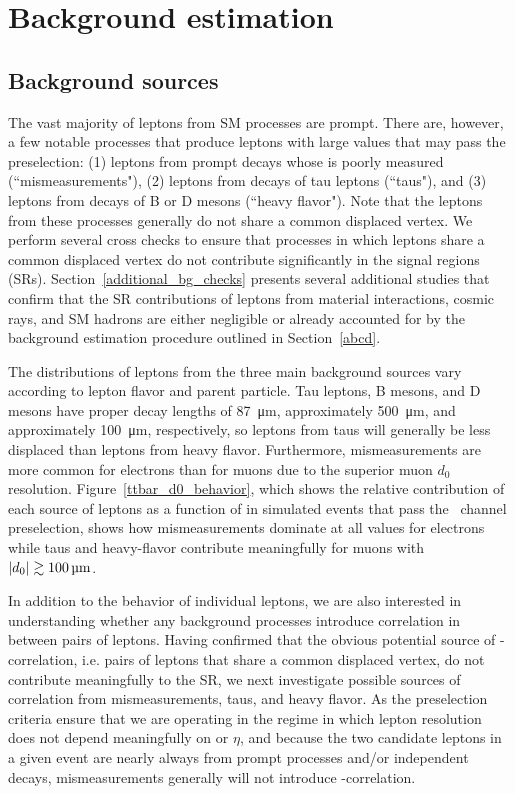 \section{Background estimation}
\label{bg}
\subsection{Background sources}
\label{bg_sources}
The vast majority of leptons from SM processes are prompt. There are, however, a few notable processes that produce leptons with large \ad values that may pass the preselection: (1) leptons from prompt decays whose \ad is poorly measured (``mismeasurements"), (2) leptons from  decays of tau leptons (``taus"), and (3) leptons from decays of B or D mesons (``heavy flavor"). Note that the leptons from these processes generally do not share a common displaced vertex. We perform several cross checks to ensure that processes in which leptons share a common displaced vertex do not contribute significantly in the signal regions (SRs). Section~\ref{additional_bg_checks} presents several additional studies that confirm that the SR contributions of leptons from material interactions, cosmic rays, and SM hadrons are either negligible or already accounted for by the background estimation procedure outlined in Section~\ref{abcd}.

The \ad distributions of leptons from the three main background sources vary according to lepton flavor and parent particle. Tau leptons, B mesons, and D mesons have proper decay lengths of \SI{87}{\um}, approximately \SI{500}{\um}, and approximately \linebreak[4]\SI{100}{\um}, respectively, so leptons from taus will generally be less displaced than leptons from heavy flavor. Furthermore, mismeasurements are more common for electrons than for muons due to the superior muon $d_0$ resolution. Figure~\ref{ttbar_d0_behavior}, which shows the relative contribution of each source of leptons as a function of \ad in simulated \ttbar events that pass the \Pe\Pgm\ channel preselection, shows how mismeasurements dominate at all \ad values for electrons while taus and heavy-flavor contribute meaningfully for muons with $\ad\gtrsim\SI{100}{\um}$.



In addition to the \ad behavior of individual leptons, we are also interested in understanding whether any background processes introduce correlation in \ad between pairs of leptons. Having confirmed that the obvious potential source of \ad-\ad correlation, i.e. pairs of leptons that share a common displaced vertex, do not contribute meaningfully to the SR, we next investigate possible sources of correlation from mismeasurements, taus, and heavy flavor. As the preselection criteria ensure that we are operating in the regime in which lepton \ad resolution does not depend meaningfully on \pt or $\eta$, and because the two candidate leptons in a given event are nearly always from prompt processes and/or independent decays, mismeasurements generally will not introduce \ad-\ad correlation.

